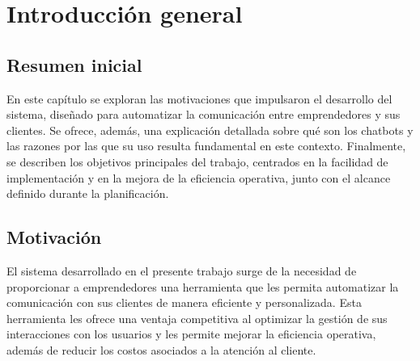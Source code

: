 
\chapter{Introducción general} %

\label{Chapter1} %
\label{IntroGeneral}



\newcommand{\keyword}[1]{\textbf{#1}}
\newcommand{\tabhead}[1]{\textbf{#1}}
\newcommand{\code}[1]{\texttt{#1}}
\newcommand{\file}[1]{\texttt{\bfseries#1}}
\newcommand{\option}[1]{\texttt{\itshape#1}}
\newcommand{\grados}{$^{\circ}$}



\section{Resumen inicial{}}
En este capítulo se exploran las motivaciones que impulsaron el desarrollo del sistema, diseñado para automatizar la comunicación entre emprendedores y sus clientes. Se ofrece, además, una explicación detallada sobre qué son los chatbots y las razones por las que su uso resulta fundamental en este contexto. Finalmente, se describen los objetivos principales del trabajo, centrados en la facilidad de implementación y en la mejora de la eficiencia operativa, junto con el alcance definido durante la planificación.

\section{Motivación{}}

El sistema desarrollado en el presente trabajo surge de la necesidad de proporcionar a emprendedores una herramienta que les permita automatizar la comunicación con sus clientes de manera eficiente y personalizada. Esta herramienta les ofrece una ventaja competitiva al optimizar la gestión de sus interacciones con los usuarios y les permite mejorar la eficiencia operativa, además de reducir los costos asociados a la atención al cliente.


